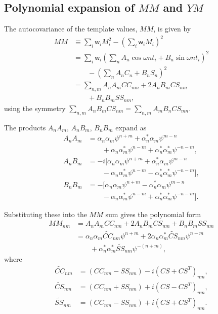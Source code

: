 \documentclass[apj]{emulateapj}
\newcommand{\wgt}{\mathsf{w}}  %
\newcommand{\CCt}{\widetilde{CC}}
\newcommand{\CSt}{\widetilde{CS}}
\newcommand{\SSt}{\widetilde{SS}}
\newcommand{\eith}{\psi}
\begin{document}
\begin{appendix}
\subsection{Polynomial expansion of $MM$ and $YM$}
\label{app:mmandym}

The autocovariance of the template values, $MM$, is given by
\begin{align}
MM &\equiv \sum_i \wgt_i M_i^2 - \left(\sum_i \wgt_i M_i\right)^2 \nonumber\\
   &= \sum_i \wgt_i \left(\sum_n A_n\cos{\omega n t_i} + B_n\sin{\omega n t_i}\right)^2 \nonumber\\
   &\qquad - \left(\sum_n A_n C_n + B_n S_n\right)^2 \nonumber\\
   &= \sum_{n,m} A_n A_m CC_{nm} + 2 A_n B_m CS_{nm} \nonumber\\
   &\qquad + B_n B_m SS_{nm},
\end{align}
using the symmetry
$\sum_{n,m} A_n B_m CS_{nm} = \sum_{n,m} A_m B_n CS_{mn}$.

The products $A_n A_m$, $A_n B_m$, $B_n B_m$ expand as
\begin{align}
A_n A_m &= \alpha_n\alpha_m \eith^{n+m} + \alpha^{*}_n\alpha_m \eith^{m-n} \nonumber\\
        &\qquad + \alpha_n\alpha^{*}_m \eith^{n-m} + \alpha^{*}_n\alpha^{*}_m \eith^{-n-m},\\
A_n B_m &= -i\bigl[\alpha_n\alpha_m \eith^{n+m} + \alpha^{*}_n\alpha_m \eith^{m-n} \nonumber\\
        &\qquad - \alpha_n\alpha^{*}_m \eith^{n-m} - \alpha^{*}_n\alpha^{*}_m \eith^{-n-m}\bigr],\\
B_n B_m &= -\bigl[\alpha_n\alpha_m \eith^{n+m} - \alpha^{*}_n\alpha_m \eith^{m-n} \nonumber\\
        &\qquad - \alpha_n\alpha^{*}_m \eith^{n-m} + \alpha^{*}_n\alpha^{*}_m \eith^{-n-m}\bigr].
\end{align}

Substituting these into the $MM$ sum gives the polynomial form
\begin{align}\label{eq:appMM}
MM_{nm} &= A_n A_m CC_{nm} + 2 A_n B_m CS_{nm} + B_n B_m SS_{nm} \nonumber\\
        &= \alpha_n\alpha_m\CCt_{nm}\eith^{n+m} + 2\alpha_n\alpha^{*}_m\CSt_{nm}\eith^{n-m} \nonumber\\
        &\qquad + \alpha^{*}_n\alpha^{*}_m\SSt_{nm}\eith^{-(n+m)},
\end{align}
where
\begin{align}
\CCt_{nm}  &= (CC_{nm} - SS_{nm}) - i\left(CS + CS^T\right)_{nm}, \\
\CSt_{nm}  &= (CC_{nm} + SS_{nm}) + i\left(CS - CS^T\right)_{nm},\\
\SSt_{nm}  &= (CC_{nm} - SS_{nm}) + i\left(CS + CS^T\right)_{nm}.
\end{align}


\end{appendix}
\end{document}
